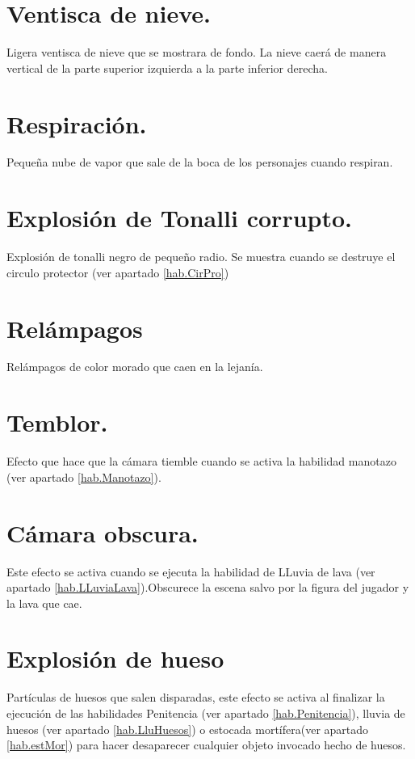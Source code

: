 \section{Ventisca de nieve.} \label{FX:VenNieve}
Ligera ventisca de nieve que se mostrara de fondo. La nieve caerá de manera vertical de la parte superior izquierda a la parte inferior derecha.

\section{Respiración.} \label{FX:Respiracion}
Pequeña nube de vapor que sale de la boca de los personajes cuando respiran.

\section{Explosión de Tonalli corrupto.} \label{FX:ExTonCor}
Explosión de tonalli negro de pequeño radio. Se muestra cuando se destruye el circulo protector (ver apartado \ref{hab.CirPro})

\section{Relámpagos} \label{FX:Relam}
Relámpagos de color morado que caen en la lejanía.

\section{Temblor.} \label{FX:temblor}
Efecto que hace que la cámara tiemble cuando se activa la habilidad manotazo (ver apartado \ref{hab.Manotazo}).

\section{Cámara obscura.} \label{FX:CamObs}
Este efecto se activa cuando se ejecuta la habilidad de LLuvia de lava (ver apartado \ref{hab.LLuviaLava}).Obscurece la escena salvo por la figura del jugador y la lava que cae.  

\section{Explosión de hueso} \label{FX:exHuesos}
Partículas de huesos que salen disparadas, este efecto se activa al finalizar la ejecución de las habilidades Penitencia (ver apartado \ref{hab.Penitencia}), lluvia de huesos (ver apartado \ref{hab.LluHuesos}) o estocada mortífera(ver apartado \ref{hab.estMor}) para hacer desaparecer cualquier objeto invocado hecho de huesos.